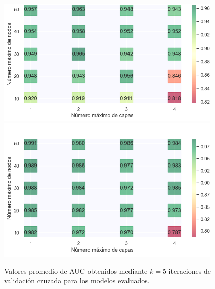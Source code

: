 \begin{figure}[H]
	\centering
	\hspace{1em}
	{\includegraphics[width=0.96\textwidth]{./Figures/AUC_exploracion_dataset1.png}}
	\hspace{1em}
	{\includegraphics[width=0.96\textwidth]{./Figures/AUC_exploracion_dataset2.png}}
	\caption[Valores promedio de AUC obtenidos mediante $k=5$ iteraciones de validación cruzada.]{Valores promedio de AUC obtenidos mediante $k=5$ iteraciones de validación cruzada para los modelos evaluados.}\label{fig:AUC_exploracion_dataset}
\end{figure}

